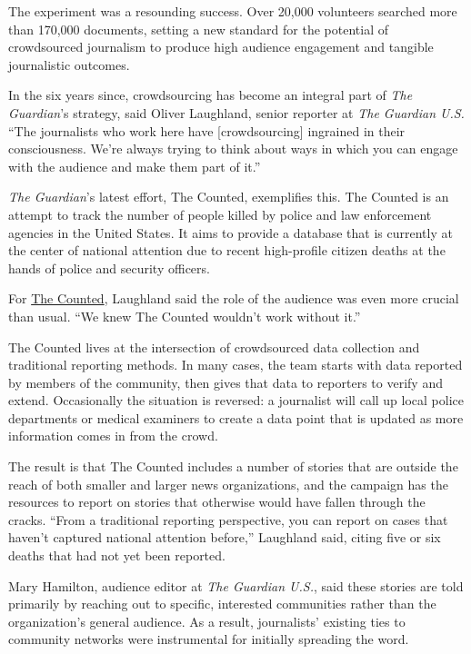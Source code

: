 \documentclass[notoc, symmetric, nobib, nols]{towcenter-guideto-book}
\begin{document}
The experiment was a resounding success. Over 20,000 volunteers searched more than 170,000 documents, setting a new standard for the potential of crowdsourced journalism to produce high audience engagement and tangible journalistic outcomes. 

In the six years since, crowdsourcing has become an integral part of \textit{The Guardian}'s strategy, said Oliver Laughland, senior reporter at \textit{The Guardian U.S.}%
 ``The journalists who work here have [crowdsourcing] ingrained in their consciousness. We're always trying to think about ways in which you can engage with the audience and make them part of it.''

\textit{The Guardian}'s latest effort, The Counted, exemplifies this.\autocite{Counted} The Counted is an attempt to track the number of people killed by police and law enforcement agencies in the United States. It aims to provide a database that is currently at the center of national attention due to recent high-profile citizen deaths at the hands of police and security officers.

For \href{http://www.theguardian.com/us-news/series/counted-us-police-killings}{The Counted}, Laughland said the role of the audience was even more crucial than usual. ``We knew The Counted wouldn't work without it.''%

The Counted lives at the intersection of crowdsourced data collection and traditional reporting methods. In many cases, the team starts with data reported by members of the community, then gives that data to reporters to verify and extend. Occasionally the situation is reversed: a journalist will call up local police departments or medical examiners to create a data point that is updated as more information comes in from the crowd. 

The result is that The Counted includes a number of stories that are outside the reach of both smaller and larger news organizations, and the campaign has the resources to report on stories that otherwise would have fallen through the cracks. ``From a traditional reporting perspective, you can report on cases that haven't captured national attention before,'' Laughland said, citing five or six deaths that had not yet been reported. 

Mary Hamilton, audience editor at \textit{The Guardian U.S.}, said these stories are told primarily by reaching out to specific, interested communities rather than the organization's general audience.%
 As a result, journalists' existing ties to community networks were instrumental for initially spreading the word.
\end{document}
